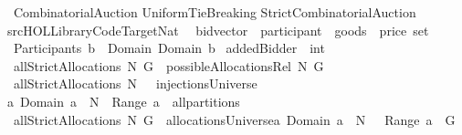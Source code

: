 %
\begin{isabellebody}%
\def\isabellecontext{CombinatorialAuction}%
%
\isamarkuptrue%
%
\isadelimtheory
%
\endisadelimtheory
%
\isatagtheory
{}\isamarkupfalse%
\ CombinatorialAuction\isanewline
\isanewline
{}\isanewline
\isanewline
UniformTieBreaking\isanewline
StrictCombinatorialAuction\isanewline
{\isachardoublequoteopen}{\isachartilde}{\isachartilde}{\isacharslash}src{\isacharslash}HOL{\isacharslash}Library{\isacharslash}Code{\isacharunderscore}Target{\isacharunderscore}Nat{\isachardoublequoteclose}\ \isanewline
\isanewline
{}%
\endisatagtheory
{\isafoldtheory}%
%
\isadelimtheory
%
\endisadelimtheory
%
\isamarkuptrue%
\isamarkupfalse%
\ bidvector{\isacharprime}\ {\isacharequal}\ {\isachardoublequoteopen}{\isacharparenleft}{\isacharparenleft}participant\ {\isasymtimes}\ goods{\isacharparenright}\ {\isasymtimes}\ price{\isacharparenright}\ set{\isachardoublequoteclose}\isanewline
{}\isamarkupfalse%
\ {\isachardoublequoteopen}Participants\ b{\isacharprime}\ {\isacharequal}{\isacharequal}\ Domain\ {\isacharparenleft}Domain\ b{\isacharprime}{\isacharparenright}{\isachardoublequoteclose}\isanewline
{}\isamarkupfalse%
\ {\isachardoublequoteopen}addedBidder{\isacharprime}\ {\isacharequal}{\isacharequal}\ {\isacharparenleft}{\isacharminus}{}{\isacharcolon}{\isacharcolon}int{\isacharparenright}{\isachardoublequoteclose}\isanewline
{}\isamarkupfalse%
\ {\isachardoublequoteopen}allStrictAllocations{\isacharprime}\ N\ G\ {\isacharequal}{\isacharequal}\ possibleAllocationsRel\ N\ G{\isachardoublequoteclose}\isanewline
{}\isamarkupfalse%
\ {\isachardoublequoteopen}allStrictAllocations{\isacharprime}{\isacharprime}\ N\ {\isasymOmega}\ {\isacharequal}{\isacharequal}\ injectionsUniverse\ {\isasyminter}\ \isanewline
{\isacharbraceleft}a{\isachardot}\ Domain\ a\ {\isasymsubseteq}\ N\ {\isacharampersand}\ Range\ a\ {\isasymin}\ all{\isacharunderscore}partitions\ {\isasymOmega}{\isacharbraceright}{\isachardoublequoteclose}\ \isanewline
{}\isamarkupfalse%
\ {\isachardoublequoteopen}allStrictAllocations{\isacharprime}{\isacharprime}{\isacharprime}\ N\ G\ {\isacharequal}{\isacharequal}\ allocationsUniverse{\isasyminter}{\isacharbraceleft}a{\isachardot}\ Domain\ a\ {\isasymsubseteq}\ N\ {\isacharampersand}\ {\isasymUnion}\ Range\ a\ {\isacharequal}\ G{\isacharbraceright}{\isachardoublequoteclose}\isanewline

\end{isabellebody}

